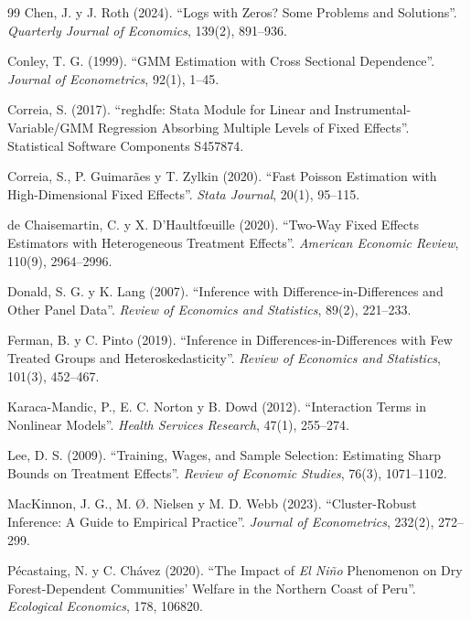 \documentclass[11pt,a4paper]{article}
\begin{document}
\begin{thebibliography}{99}
Chen, J. y J. Roth (2024). ``Logs with Zeros? Some Problems and Solutions''. \emph{Quarterly Journal of Economics}, 139(2), 891--936.

Conley, T. G. (1999). ``GMM Estimation with Cross Sectional Dependence''. \emph{Journal of Econometrics}, 92(1), 1--45.

Correia, S. (2017). ``reghdfe: Stata Module for Linear and Instrumental-Variable/GMM Regression Absorbing Multiple Levels of Fixed Effects''. Statistical Software Components S457874.

Correia, S., P. Guimarães y T. Zylkin (2020). ``Fast Poisson Estimation with High-Dimensional Fixed Effects''. \emph{Stata Journal}, 20(1), 95--115.

de Chaisemartin, C. y X. D'Haultf\oe uille (2020). ``Two-Way Fixed Effects Estimators with Heterogeneous Treatment Effects''. \emph{American Economic Review}, 110(9), 2964--2996.

Donald, S. G. y K. Lang (2007). ``Inference with Difference-in-Differences and Other Panel Data''. \emph{Review of Economics and Statistics}, 89(2), 221--233.

Ferman, B. y C. Pinto (2019). ``Inference in Differences-in-Differences with Few Treated Groups and Heteroskedasticity''. \emph{Review of Economics and Statistics}, 101(3), 452--467.

Karaca-Mandic, P., E. C. Norton y B. Dowd (2012). ``Interaction Terms in Nonlinear Models''. \emph{Health Services Research}, 47(1), 255--274.

Lee, D. S. (2009). ``Training, Wages, and Sample Selection: Estimating Sharp Bounds on Treatment Effects''. \emph{Review of Economic Studies}, 76(3), 1071--1102.

MacKinnon, J. G., M. Ø. Nielsen y M. D. Webb (2023). ``Cluster-Robust Inference: A Guide to Empirical Practice''. \emph{Journal of Econometrics}, 232(2), 272--299.

Pécastaing, N. y C. Chávez (2020). ``The Impact of \emph{El Niño} Phenomenon on Dry Forest-Dependent Communities' Welfare in the Northern Coast of Peru''. \emph{Ecological Economics}, 178, 106820.


\end{thebibliography}
\end{document}

